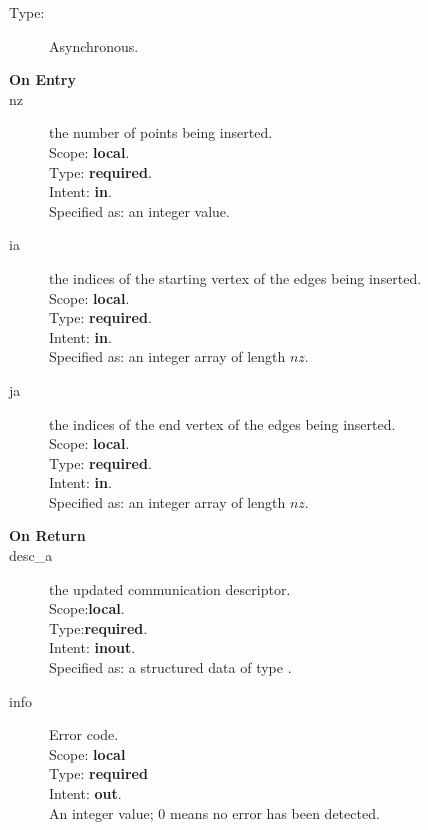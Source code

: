 \begin{description}
\item[Type:] Asynchronous.
\item[\bf On Entry]
\item[nz] the number of points being inserted.\\
Scope: {\bf local}.\\
Type: {\bf required}.\\
Intent: {\bf in}.\\
Specified as: an integer value.
\item[ia] the indices of the starting vertex of the edges  being inserted.\\
Scope: {\bf local}.\\
Type: {\bf required}.\\
Intent: {\bf in}.\\
Specified as: an integer array of length $nz$.
\item[ja]  the indices of the end vertex of the edges  being inserted.\\
Scope: {\bf local}.\\
Type: {\bf required}.\\
Intent: {\bf in}.\\
Specified as: an integer array of length $nz$.
\end{description}

\begin{description}
\item[\bf On Return]
\item[desc\_a] the updated communication descriptor.\\
Scope:{\bf local}.\\
Type:{\bf required}.\\
Intent: {\bf inout}.\\
Specified as: a structured data of type \descdata.
\item[info] Error code.\\
Scope: {\bf local} \\
Type: {\bf required} \\
Intent: {\bf out}.\\
An integer value; 0 means no error has been detected. 
\end{description}
